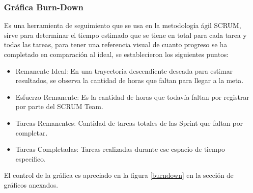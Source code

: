 \subsubsection{Gráfica Burn-Down}

Es una herramienta de seguimiento que se usa en la metodología ágil SCRUM, sirve para determinar el tiempo estimado que se tiene en total para cada tarea y todas las tareas, para tener una referencia visual de cuanto progreso se ha completado en comparación al ideal, se establecieron los siguientes puntos:

\begin{itemize}
	\item Remanente Ideal: En una trayectoria descendiente deseada para estimar resultados, se observa la cantidad de horas que faltan para llegar a la meta.
	\item Esfuerzo Remanente: Es la cantidad de horas que todavía faltan por registrar por parte del SCRUM Team.
	\item Tareas Remanentes: Cantidad de tareas totales de las Sprint que faltan por completar.
	\item Tareas Completadas: Tareas realizadas durante ese espacio de tiempo especifico. 
\end{itemize}
				
El control de la gráfica es apreciado en la figura \ref{burndown} en la sección de gráficos anexados.



